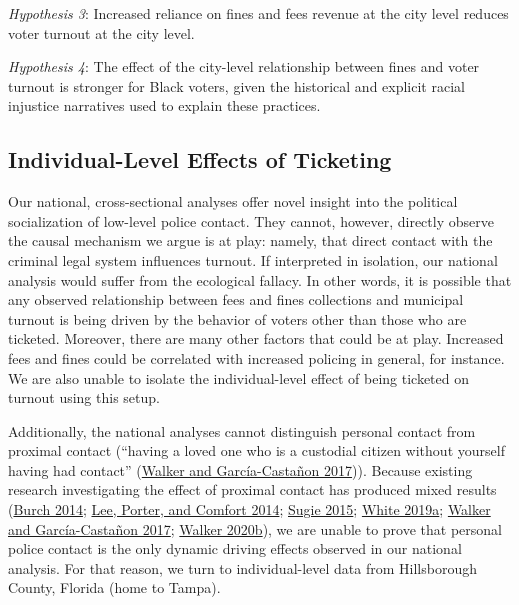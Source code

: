 \documentclass[
  12pt,
]{article}
\begin{document}
\emph{Hypothesis 3}: Increased reliance on fines and fees revenue at the city level reduces voter turnout at the city level.

\emph{Hypothesis 4}: The effect of the city-level relationship between fines and voter turnout is stronger for Black voters, given the historical and explicit racial injustice narratives used to explain these practices.

\hypertarget{individual-level-effects-of-ticketing}{%
\subsection*{Individual-Level Effects of Ticketing}\label{individual-level-effects-of-ticketing}}

Our national, cross-sectional analyses offer novel insight into the political socialization of low-level police contact. They cannot, however, directly observe the causal mechanism we argue is at play: namely, that direct contact with the criminal legal system influences turnout. If interpreted in isolation, our national analysis would suffer from the ecological fallacy. In other words, it is possible that any observed relationship between fees and fines collections and municipal turnout is being driven by the behavior of voters other than those who are ticketed. Moreover, there are many other factors that could be at play. Increased fees and fines could be correlated with increased policing in general, for instance. We are also unable to isolate the individual-level effect of being ticketed on turnout using this setup.

Additionally, the national analyses cannot distinguish personal contact from proximal contact (``having a loved one who is a custodial citizen without yourself having had contact'' (\protect\hyperlink{ref-Walker2017}{Walker and García-Castañon 2017})). Because existing research investigating the effect of proximal contact has produced mixed results (\protect\hyperlink{ref-Burch2014}{Burch 2014}; \protect\hyperlink{ref-Lee2014}{Lee, Porter, and Comfort 2014}; \protect\hyperlink{ref-Sugie2015}{Sugie 2015}; \protect\hyperlink{ref-White2019}{White 2019a}; \protect\hyperlink{ref-Walker2017}{Walker and García-Castañon 2017}; \protect\hyperlink{ref-Walker2020}{Walker 2020b}), we are unable to prove that personal police contact is the only dynamic driving effects observed in our national analysis. For that reason, we turn to individual-level data from Hillsborough County, Florida (home to Tampa).
\end{document}

